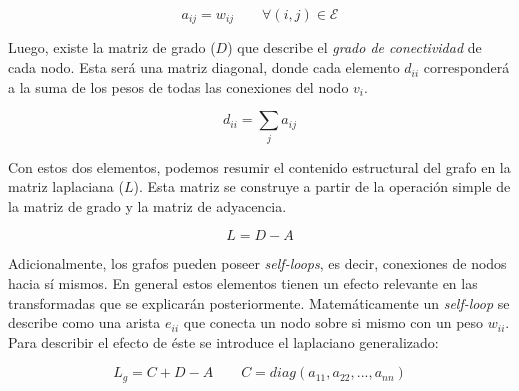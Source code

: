     \begin{equation*}
        a_{ij} = w_{ij} \quad \quad \forall (i,j) \in \mathcal{E}    
    \end{equation*}

    \vspace{0.4cm}

    Luego, existe la matriz de grado ($D$) que describe el \textit{grado de conectividad} de cada nodo. Esta será una matriz diagonal, donde cada elemento $d_{ii}$ corresponderá a la suma de los pesos de todas las conexiones del nodo $v_i$.

    \vspace{0.4cm}

    \begin{equation*}
        d_{ii} = \sum_{j}a_{ij}
    \end{equation*}

    \vspace{0.4cm}
    
    Con estos dos elementos, podemos resumir el contenido estructural del grafo en la matriz laplaciana ($L$). Esta matriz se construye a partir de la operación simple de la matriz de grado y la matriz de adyacencia.

    \begin{equation*}
        L = D- A
    \end{equation*}
    
    \vspace{0.4cm}
    
    Adicionalmente, los grafos pueden poseer \textit{self-loops}, es decir, conexiones de nodos hacia sí mismos. En general estos elementos tienen un efecto relevante en las transformadas que se explicarán posteriormente. Matemáticamente un \textit{self-loop} se describe como una arista $e_{ii}$ que conecta un nodo sobre si mismo con un peso $w_{ii}$. Para describir el efecto de éste se introduce el laplaciano generalizado:

    \begin{equation*}
        L_g = C + D - A \quad \quad C = diag(a_{11},a_{22},...,a_{nn})
    \end{equation*}

    \vspace{0.4cm}

